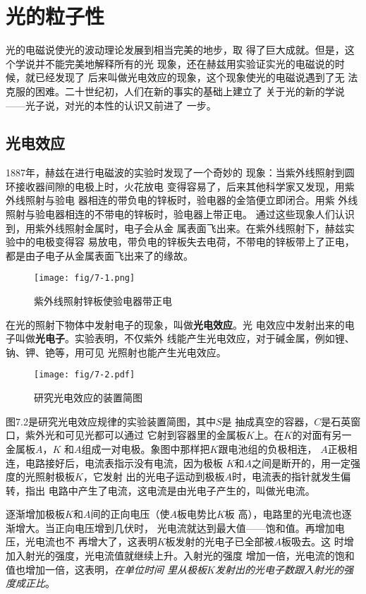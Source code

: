 \chapter{光的粒子性}
光的电磁说使光的波动理论发展到相当完美的地步，取
得了巨大成就。但是，这个学说并不能完美地解释所有的光
现象，还在赫兹用实验证实光的电磁说的时候，就已经发现了
后来叫做光电效应的现象，这个现象使光的电磁说遇到了无
法克服的困难。二十世纪初，人们在新的事实的基础上建立了
关于光的新的学说——光子说，对光的本性的认识又前进了
一步。


\section{光电效应}
1887年，赫兹在进行电磁波的实验时发现了一个奇妙的
现象：当紫外线照射到圆环接收器间隙的电极上时，火花放电
变得容易了，后来其他科学家又发现，用紫外线照射与验电
器相连的带负电的锌板时，验电器的金箔便立即闭合。用紫
外线照射与验电器相连的不带电的锌板时，验电器上带正电。
通过这些现象人们认识到，用紫外线照射金属时，电子会从金
属表面飞出来。在紫外线照射下，赫兹实验中的电极变得容
易放电，带负电的锌板失去电荷，不带电的锌板带上了正电，
都是由子电子从金属表面飞出来了的缘故。
\begin{figure}[htp]\centering
    \texttt{[image: fig/7-1.png]}
    \caption{紫外线照射锌板使验电器带正电}
    \end{figure}

在光的照射下物体中发射电子的现象，叫做\textbf{光电效应}。光
电效应中发射出来的电子叫做\textbf{光电子}。实验表明，不仅紫外
线能产生光电效应，对于碱金属，例如锂、钠、钾、铯等，用可见
光照射也能产生光电效应。
\begin{figure}[htp]\centering
    \texttt{[image: fig/7-2.pdf]}
    \caption{研究光电效应的装置简图}
    \end{figure}

图7.2是研究光电效应规律的实验装置简图，其中$S$是
抽成真空的容器，$C$是石英窗口，紫外光和可见光都可以通过
它射到容器里的金属板$K$上。在$K$的对面有另一金属板$A$，$K$
和$A$组成一对电极。象图中那样把$K$跟电池组的负极相连，
$A$正极相连，电路接好后，电流表指示没有电流，因为极板
$K$和$A$之间是断开的，用一定强度的光照射极板$K$，它发射
出的光电子运动到极板$A$时，电流表的指针就发生偏转，指出
电路中产生了电流，这电流是由光电子产生的，叫做光电流。

逐渐增加极板$K$和$A$间的正向电压（使$A$板电势比$K$板
高），电路里的光电流也逐渐增大。当正向电压增到几伏时，
光电流就达到最大值——饱和值。再增加电压，光电流也不
再增大了，这表明$K$板发射的光电子已全部被$A$板吸去。这
时增加入射光的强度，光电流值就继续上升。入射光的强度
增加一倍，光电流的饱和值也增加一倍，这表明，\textit{在单位时间
里从极板$K$发射出的光电子数跟入射光的强度成正比}。

